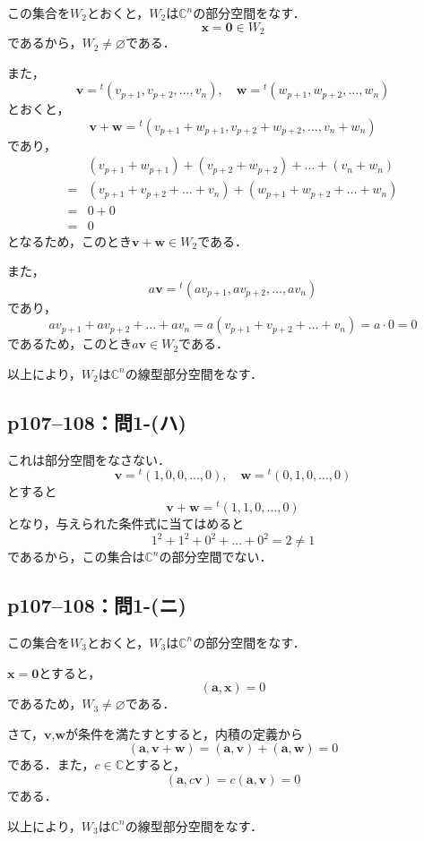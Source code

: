 \documentclass[a4paper,10pt,fleqn]{ltjsarticle}
\begin{document}
\begin{tleftbar}
  この集合を$W_2$とおくと，$W_2$は$\mathbb{C}^n$の部分空間をなす．
  \[
    \bm{x} = \bm{0} \in W_2
  \]
  であるから，$W_2 \ne \varnothing$である．

  また，
  \[
    \bm{v} ={}^t (v_{p+1} , v_{p+2} , \ldots , v_{n} ) , \quad \bm{w} ={}^t ( w_{p+1} , w_{p+2} , \ldots , w_{n} )
  \]
  とおくと，
  \[
    \bm{v}+ \bm{w} = {}^t (v_{p+1}+w_{p+1},v_{p+2}+w_{p+2},\ldots,v_n + w_n)
  \]
  であり，
  \begin{align*}
      & ( v_{p+1}+w_{p+1}) +(v_{p+2}+w_{p+2})+ \dots + (v_n+w_n) \\
    = & (v_{p+1}+v_{p+2}+\dots+v_n)+(w_{p+1}+w_{p+2}+\dots+w_n)  \\
    = & 0+0                                                      \\
    = & 0
  \end{align*}
  となるため，このとき$\bm{v}+\bm{w} \in W_2$である．

  また，
  \[
    a\bm{v} = {}^t (av_{p+1},av_{p+2},\ldots,av_n)
  \]
  であり，
  \[
    av_{p+1} + av_{p+2}+\dots + av_n =a (v_{p+1}+v_{p+2}+\dots+v_n) = a\cdot 0 =0
  \]
  であるため，このとき$a \bm{v} \in W_2$である．

  以上により，$W_2$は$\mathbb{C}^n$の線型部分空間をなす．
\end{tleftbar}

\subsection*{p107--108：問1-(ハ)}

\begin{tleftbar}
  これは部分空間をなさない．
  \[
    \bm{v}= {}^t (1,0,0,\ldots , 0),\quad \bm{w}={}^t (0,1,0,\ldots ,0)
  \]
  とすると
  \[
    \bm{v} + \bm{w}={}^t (1,1,0,\ldots,0)
  \]
  となり，与えられた条件式に当てはめると
  \[
    1^2+1^2+0^2 +\dots + 0^2 =2 \ne 1
  \]
  であるから，この集合は$\mathbb{C}^n$の部分空間でない．
\end{tleftbar}


\subsection*{p107--108：問1-(ニ)}

\begin{tleftbar}
  この集合を$W_3$とおくと，$W_3$は$\mathbb{C}^n$の部分空間をなす．

  $\bm{x}=\bm{0}$とすると，
  \[
    (\bm{a},\bm{x}) =0
  \]
  であるため，$W_3 \ne \varnothing$である．

  さて，$\bm{v}$,$\bm{w}$が条件を満たすとすると，内積の定義から
  \[
    (\bm{a},\bm{v}+\bm{w})=(\bm{a},\bm{v})+(\bm{a},\bm{w})=0
  \]
  である．また，$ c \in \mathbb{C}$とすると，
  \[
    (\bm{a},c\bm{v})=c(\bm{a},\bm{v})=0
  \]
  である．

  以上により，$W_3$は$\mathbb{C}^n$の線型部分空間をなす．
\end{tleftbar}
\end{document}
